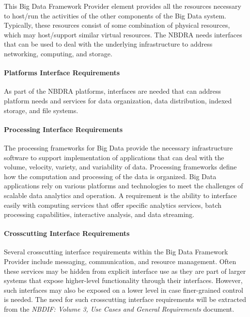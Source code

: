 \documentclass[9pt,]{article}
\let\oldparagraph\paragraph
\renewcommand{\paragraph}[1]{\oldparagraph{#1}\mbox{}}
\begin{document}
This Big Data Framework Provider element provides all the resources
necessary to host/run the activities of the other components of the Big
Data system. Typically, these resources consist of some combination of
physical resources, which may host/support similar virtual resources.
The NBDRA needs interfaces that can be used to deal with the underlying
infrastructure to address networking, computing, and storage.

\hypertarget{platforms-interface-requirements}{%
\paragraph{Platforms Interface
Requirements}\label{platforms-interface-requirements}}

As part of the NBDRA platforms, interfaces are needed that can address
platform needs and services for data organization, data distribution,
indexed storage, and file systems.

\hypertarget{processing-interface-requirements}{%
\paragraph{Processing Interface
Requirements}\label{processing-interface-requirements}}

The processing frameworks for Big Data provide the necessary
infrastructure software to support implementation of applications that
can deal with the volume, velocity, variety, and variability of data.
Processing frameworks define how the computation and processing of the
data is organized. Big Data applications rely on various platforms and
technologies to meet the challenges of scalable data analytics and
operation. A requirement is the ability to interface easily with
computing services that offer specific analytics services, batch
processing capabilities, interactive analysis, and data streaming.

\hypertarget{crosscutting-interface-requirements}{%
\paragraph{Crosscutting Interface
Requirements}\label{crosscutting-interface-requirements}}

Several crosscutting interface requirements within the Big Data
Framework Provider include messaging, communication, and resource
management. Often these services may be hidden from explicit interface
use as they are part of larger systems that expose higher-level
functionality through their interfaces. However, such interfaces may
also be exposed on a lower level in case finer-grained control is
needed. The need for such crosscutting interface requirements will be
extracted from the \emph{NBDIF: Volume 3, Use Cases and General
Requirements} document.
\end{document}
